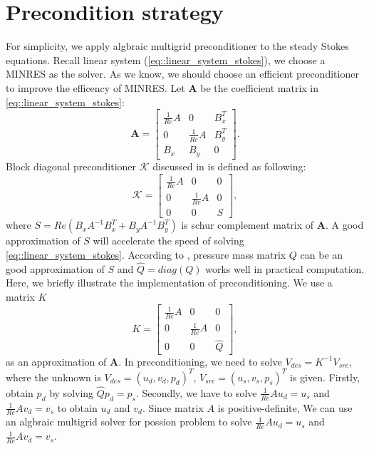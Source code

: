 \documentclass[mathpazo]{aamm}
\begin{document}
\section{Precondition strategy}
   \label{sec5} For simplicity, we apply algbraic multigrid
   preconditioner to the steady Stokes equations. Recall linear system
   (\ref{eq::linear_system_stokes}),  we choose a
   MINRES as the solver. As we know, we should choose an efficient
   preconditioner to improve the efficency of MINRES. 
   Let $\mathbf{A}$ be the coefficient matrix in
   \eqref{eq::linear_system_stokes}: 
   \begin{equation}
     \mathbf{A} = \left[
       \begin{array}{lll}
         \frac{1}{Re} A & 0 & B_x^T \\
         0 & \frac{1}{Re} A  & B_y^T \\
         B_x & B_y & 0
           \end{array}
         \right].     
   \end{equation}
   Block diagonal preconditioner $\mathcal{K}$ discussed in \cite{elman2005finite}
   is defined as following:
   \begin{equation}
     \mathcal{K}  = \left[
       \begin{array}{lll}
         \frac{1}{Re} A & 0 & 0 \\
         0 & \frac{1}{Re} A  & 0 \\
         0 & 0 & S
           \end{array}
         \right],      
   \end{equation}
   where $S = Re (B_x A^{-1} B_x^T + B_y A^{-1}B_y^T)$ is schur complement
   matrix of $\mathbf{A}$.  A good approximation of $S$ will
   accelerate the speed of solving \eqref{eq::linear_system_stokes}.
   According to \cite{elman2005finite}, pressure mass matrix $Q$ can
   be an good approximation of $S$ and  $\hat{Q} = diag(Q)$
   works well in practical computation. Here, we briefly illustrate 
   the implementation of preconditioning.
   We use a matrix $K$ 
   \begin{equation}
     K = \left[
           \begin{array}{lll}
             \frac{1}{Re} A & 0 & 0 \\
             0 & \frac{1}{Re} A  & 0 \\
             0 & 0 & \hat{Q}
           \end{array}
         \right],     
   \end{equation}
   as an approximation of $\mathbf{A}$. In preconditioning, we need to solve $V_{des} =
   K^{-1} V_{src}$, where the unknown is $V_{des} = (u_d, v_d,
   p_d)^T$, $V_{src} = (u_s, v_s, p_s)^T$ is given. 
   Firstly, obtain $p_d$ by solving $\hat{Q} p_d = p_s$.
   Secondly, we have to solve $\frac{1}{Re}A u_d = u_s $ and $\frac{1}{Re} A
   v_d = v_s$ to obtain $u_d$ and $v_d$. Since matrix $A$ is
   positive-definite,  We can use an algbraic multigrid
   solver for possion problem to solve $\frac{1}{Re}A u_d = u_s $ and
   $\frac{1}{Re} A v_d = v_s$. 
\end{document}
